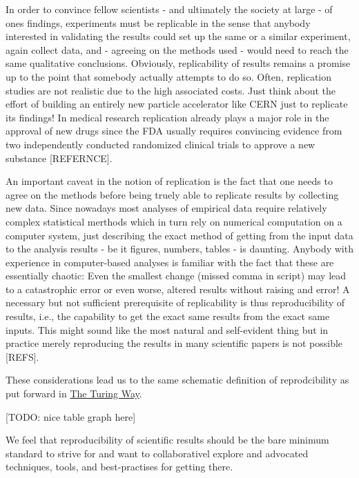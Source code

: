 \documentclass[]{book}
\begin{document}
In order to convince fellow scientists - and ultimately the society at
large - of ones findings, experiments must be replicable in the sense
that anybody interested in validating the results could set up the same
or a similar experiment, again collect data, and - agreeing on the
methods used - would need to reach the same qualitative conclusions.
Obviously, replicability of results remains a promise up to the point
that somebody actually attempts to do so. Often, replication studies are
not realistic due to the high associated costs. Just think about the
effort of building an entirely new particle accelerator like CERN just
to replicate its findings! In medical research replication already plays
a major role in the approval of new drugs since the FDA usually requires
convincing evidence from two independently conducted randomized clinical
trials to approve a new substance {[}REFERNCE{]}.

An important caveat in the notion of replication is the fact that one
needs to agree on the methods before being truely able to replicate
results by collecting new data. Since nowadays most analyses of
empirical data require relatively complex statistical merthods which in
turn rely on numerical computation on a computer system, just describing
the exact method of getting from the input data to the analysis results
- be it figures, numbers, tables - is daunting. Anybody with experience
in computer-based analyses is familiar with the fact that these are
essentially chaotic: Even the smallest change (missed comma in script)
may lead to a catastrophic error or even worse, altered results without
raising and error! A necessary but not sufficient prerequisite of
replicability is thus reproducibility of results, i.e., the capability
to get the exact same results from the exact same inputs. This might
sound like the most natural and self-evident thing but in practice
merely reproducing the results in many scientific papers is not possible
{[}REFS{]}.

These considerations lead us to the same schematic definition of
reprodcibility as put forward in
\href{https://github.com/alan-turing-institute/the-turing-way/blob/master/chapters/reproducibility.md\#the-turing-way-definition-of-reproducibility}{The
Turing Way}.

{[}TODO: nice table graph here{]}

We feel that reproducibility of scientific results should be the bare
minimum standard to strive for and want to collaborativel explore and
advocated techniques, tools, and best-practises for getting there.
\end{document}

